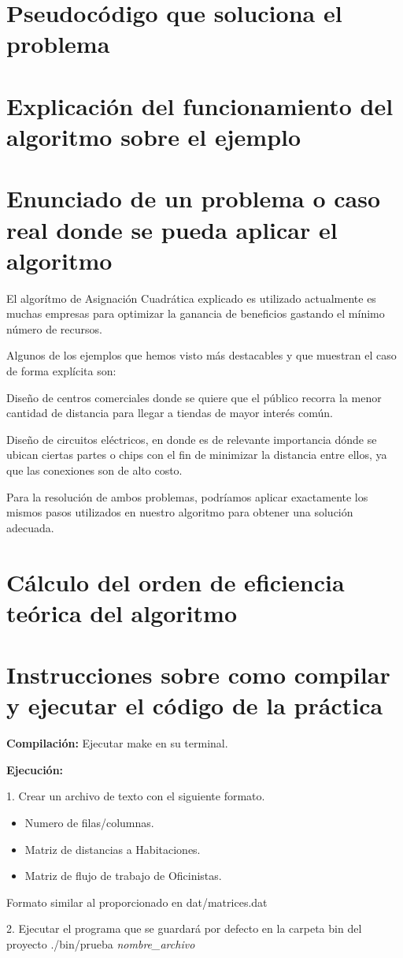 \documentclass[11pt, a4paper]{article}
\theoremstyle{theorem-style}
\theoremstyle{definition-style}
\theoremstyle{remark-style}
\theoremstyle{example-style}
\begin{document}
\section{Pseudocódigo que soluciona el problema}

\section{Explicación del funcionamiento del algoritmo sobre el ejemplo}

\section{Enunciado de un problema o caso real donde se pueda aplicar el algoritmo}

El algorítmo de Asignación Cuadrática explicado es utilizado actualmente es muchas empresas para optimizar la ganancia de beneficios gastando el mínimo número de recursos.

Algunos de los ejemplos que hemos visto más destacables y que muestran el caso de forma explícita son:

Diseño de centros comerciales donde se quiere que el público recorra
la menor cantidad de distancia para llegar a tiendas de mayor interés común. 

Diseño de circuitos eléctricos, en donde es de relevante importancia
dónde se ubican ciertas partes o chips con el fin de minimizar la
distancia entre ellos, ya que las conexiones son de alto costo.

Para la resolución de ambos problemas, podríamos aplicar exactamente los mismos pasos utilizados en nuestro algoritmo para obtener una solución adecuada.

\section{Cálculo del orden de eficiencia teórica del algoritmo }

\section{Instrucciones sobre como compilar y ejecutar el código de la práctica}

\textbf{Compilación:} Ejecutar make en su terminal.


\textbf{Ejecución:} 


1. Crear un archivo de texto con el siguiente formato.
\begin{itemize}
\item Numero de filas/columnas. 
\item Matriz de distancias a Habitaciones.
\item Matriz de flujo de trabajo de Oficinistas.
\end{itemize}
Formato similar al proporcionado en dat/matrices.dat


2. Ejecutar el programa que se guardará por defecto en la carpeta
bin del proyecto ./bin/prueba \textit{nombre\_archivo}
\end{document}
